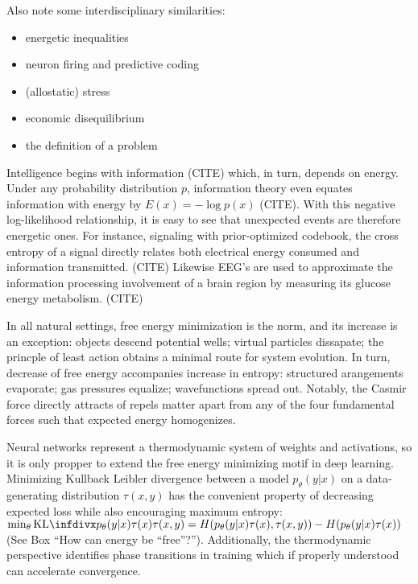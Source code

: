 \begin{WrapText}

Also note some interdisciplinary similarities:
\begin{itemize}
 \item energetic inequalities
 \item neuron firing and predictive coding
 \item (allostatic) stress
 \item economic disequilibrium
 \item the definition of a problem
\end{itemize}

\end{WrapText}

Intelligence begins with information (CITE) which, in turn, depends on energy. Under any probability distribution $p$, information theory even equates information with energy by $E(x) = - \log{p(x)} $ (CITE). With this negative log-likelihood relationship, it is easy to see that unexpected events are therefore energetic ones. For instance, signaling with prior-optimized codebook, the cross entropy of a signal directly relates both electrical energy consumed and information transmitted. (CITE) Likewise EEG's are used to approximate the information processing involvement of a brain region by measuring its glucose energy metabolism. (CITE)

In all natural settings, free energy minimization is the norm, and its increase is an exception: objects descend potential wells; virtual particles dissapate; the princple of least action obtains a minimal route for system evolution. In turn, decrease of free energy accompanies increase in entropy: structured arangements evaporate; gas pressures equalize; wavefunctions spread out. Notably, the Casmir force directly attracts of repels matter apart from any of the four fundamental forces such that expected energy homogenizes. 

Neural networks represent a thermodynamic system of weights and activations, so it is only propper to extend the free energy minimizing motif in deep learning. Minimizing Kullback Leibler divergence between a model $p_\theta(y|x)$ on a data-generating distribution $\tau(x,y)$ has the convenient property of decreasing expected loss while also encouraging maximum entropy: $\min_\theta \kld{ p_\theta(y|x)\tau(x) }{ \tau(x,y) } = H(p_\theta(y|x)\tau(x), \tau(x,y)) - H(p_\theta(y|x)\tau(x))$ (See Box ``How can energy be ``free''?''). Additionally, the thermodynamic perspective identifies phase transitions in training which if properly understood can accelerate convergence.

